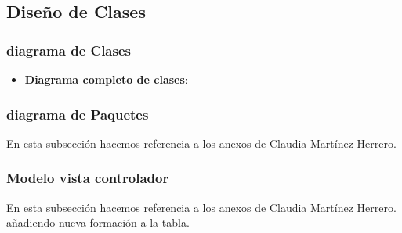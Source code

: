 \subsection{Diseño de Clases}

\subsubsection{diagrama de Clases}

\begin{itemize}
	\tightlist
	\item
	\textbf{Diagrama completo de clases}:
	
	
	
\end{itemize}

\subsubsection{diagrama de Paquetes}

En esta subsección hacemos referencia a los anexos de Claudia Martínez Herrero. \cite{claudia:anexo}

\subsubsection{Modelo vista controlador}

En esta subsección hacemos referencia a los anexos de Claudia Martínez Herrero. \cite{claudia:anexo} añadiendo nueva formación a la tabla.

